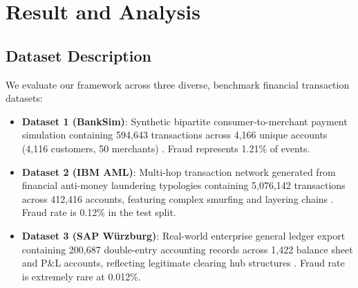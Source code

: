 \documentclass[journal]{IEEEtran}
\begin{document}
\section{Result and Analysis}\label{sec:results}

\subsection{Dataset Description}\label{sec:dataset_desc}
We evaluate our framework across three diverse, benchmark financial transaction datasets:
\begin{itemize}
    \item \textbf{Dataset 1 (BankSim)}: Synthetic bipartite consumer-to-merchant payment simulation containing 594,643 transactions across 4,166 unique accounts (4,116 customers, 50 merchants) \cite{lopez2016banksim}. Fraud represents 1.21\% of events.
    \item \textbf{Dataset 2 (IBM AML)}: Multi-hop transaction network generated from financial anti-money laundering typologies containing 5,076,142 transactions across 412,416 accounts, featuring complex smurfing and layering chains \cite{weber2019antimoney}. Fraud rate is 0.12\% in the test split.
    \item \textbf{Dataset 3 (SAP W{\"u}rzburg)}: Real-world enterprise general ledger export containing 200,687 double-entry accounting records across 1,422 balance sheet and P\&L accounts, reflecting legitimate clearing hub structures \cite{schreyer2020detection}. Fraud rate is extremely rare at 0.012\%.
\end{itemize}
\end{document}
